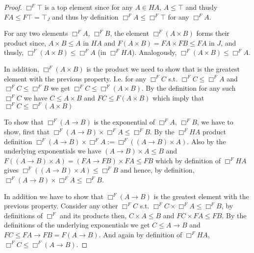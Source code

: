 \begin{proof}
    $\Box^F \top$ is a top element since for any $A\in HA$, 
    $A\le \top$ and thusly $FA\le F\top=\top_J$ and thus by definition
    $\Box^F A\le\Box^F\top $ for any $\Box^F A$.

    For any two elements $\Box^F A$, $\Box^F B$, 
    the element $\Box^F (A \times B)$ forms their product since,
    $A \times B\le A$ in $HA$ and $F(A\times B)=FA\times FB \le FA$
    in $J$, and thusly, 
    $\Box^F (A \times B)\le \Box^FA$ (in $\Box^F HA$).
    Analogously, $\Box^F (A \times B)\le \Box^FA$.

    In addition, $\Box^F (A \times B)$ is the product we need to show 
    that is the greatest element with the previous property.
    I.e. for any $\Box^F C$ s.t. $\Box^F C\le \Box^F A $ and 
    $\Box^F C\le \Box^F B $ we get $\Box^F C\le\Box^F(A\times B)$. 
    By the definition for any such  $\Box^F C$ we have $C\le A\times B$
    and $FC\le F(A\times B)$ which imply that $\Box^F C\le\Box^F(A\times B)$

    To show that  $\Box^F(A\rightarrow B)$ is the  
    exponential of $\Box^FA$, $\Box^FB$, 
    we have to show, first that 
    $\Box^F ( A\rightarrow B)\times\Box^F A\le \Box^F B$.
    By the $\Box^F HA$ product definition 
    $\Box^F ( A\rightarrow B)\times\Box^F A :=\Box^F( (A\rightarrow B)\times A)$. 
    Also
    by the underlying exponentials we have $ (A\rightarrow B)\times A\le B$ 
    and  $F((A\rightarrow B)\times A)= (FA\rightarrow FB)\times FA \le FB$
    which by definition of $\Box^F HA$ gives   
    $\Box^F((A\rightarrow B)\times A)\le \Box^F B$ 
    and hence, by definition, 
    $\Box^F ( A\rightarrow B)\times \Box^F A\le \Box^F B$.

    In addition we have to show that 
    $\Box^F ( A\rightarrow B)$ is the 
    greatest element with the previous property.
    Consider any other $\Box^F C$ s.t. $\Box^F C\times\Box^F A\le \Box^F B$, 
    by definitions of $\Box^F$ and its products then, $C\times A\le B$
     and $FC\times FA\le FB$.
      By the definitions of the underlying exponentials 
     we get $C\le A\rightarrow B$ and 
     $FC \le FA\rightarrow FB =F(A\rightarrow B)$. 
     And again by definition of $\Box^F HA$, $\Box^F C\le \Box^F(A\rightarrow B)$.  
\end{proof}

